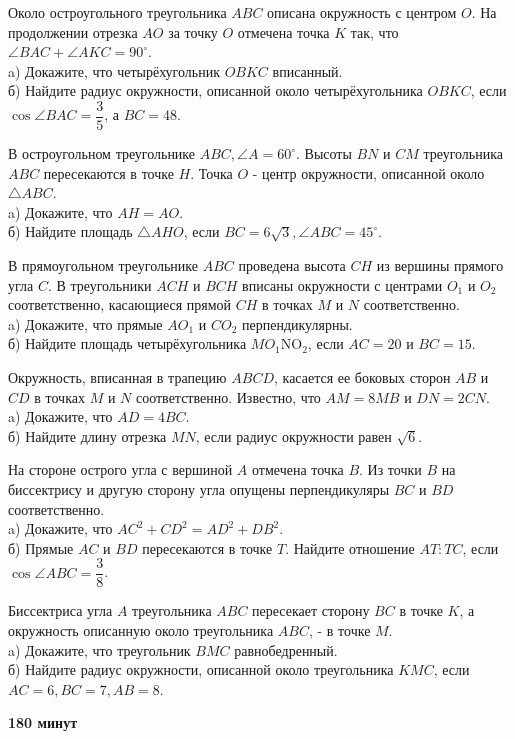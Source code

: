 \newpage
\hspace{3mm}

 Около остроугольного треугольника $A B C$ описана окружность с центром $O$. На продолжении отрезка $A O$ за точку $O$ отмечена точка $K$ так, что $\angle B A C+\angle A K C=90^{\circ}$.\\
a) Докажите, что четырёхугольник $O B K C$ вписанный.\\
б) Найдите радиус окружности, описанной около четырёхугольника $O B K C$, если $\cos \angle B A C=\dfrac{3}{5}$, а $B C=48$.

 В остроугольном треугольнике $A B C, \angle A=60^{\circ}$. Высоты $B N$ и $C M$ треугольника $A B C$ пересекаются в точке $H$. Точка $O$ - центр окружности, описанной около $\triangle A B C$.\\
a) Докажите, что $A H=A O$.\\
б) Найдите площадь $\triangle A H O$, если $B C=6 \sqrt{3}, \angle A B C=45^{\circ}$.

 В прямоугольном треугольнике $A B C$ проведена высота $C H$ из вершины прямого угла $C$. В треугольники $A C H$ и $B C H$ вписаны окружности с центрами $O_1$ и $O_2$ соответственно, касающиеся прямой $C H$ в точках $M$ и $N$ соответственно.\\
a) Докажите, что прямые $A O_1$ и $C O_2$ перпендикулярны.\\
б) Найдите площадь четырёхугольника $M O_1 \mathrm{NO}_2$, если $A C=20$ и $B C=15$.

 Окружность, вписанная в трапецию $A B C D$, касается ее боковых сторон $A B$ и $C D$ в точках $M$ и $N$ соответственно. Известно, что $A M=8 M B$ и $D N=2 C N$.\\
a) Докажите, что $A D=4 B C$.\\
б) Найдите длину отрезка $M N$, если радиус окружности равен $\sqrt{6}$.

 На стороне острого угла с вершиной $A$ отмечена точка $B$. Из точки $B$ на биссектрису и другую сторону угла опущены перпендикуляры $B C$ и $B D$ соответственно.\\
a) Докажите, что $A C^2+C D^2=A D^2+D B^2$.\\
б) Прямые $A C$ и $B D$ пересекаются в точке $T$. Найдите отношение $A T: T C$, если $\cos \angle A B C=\dfrac{3}{8}$.

 Биссектриса угла $A$ треугольника $A B C$ пересекает сторону $B C$ в точке $K$, а окружность описанную около треугольника $A B C$, - в точке $M$.\\
a) Докажите, что треугольник $B M C$ равнобедренный.\\
б) Найдите радиус окружности, описанной около треугольника $K M C$, если $A C=6, B C=7, A B=8$.\\

\centerline{\textbf{180 минут}}

